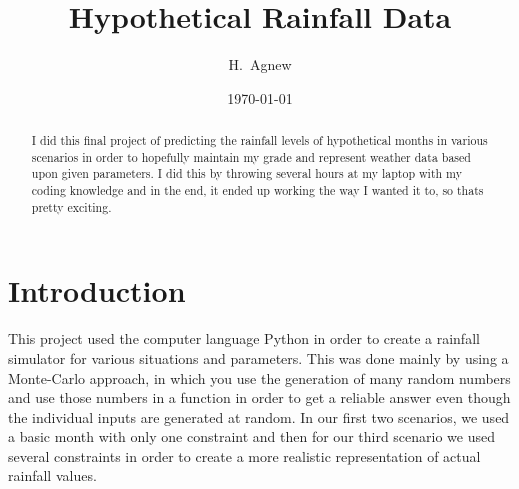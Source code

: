 \documentclass[twocolumn]{revtex4}
\begin{document}
\title{
Hypothetical Rainfall Data
}

\author{H.~Agnew}
\date{\today}

\begin{abstract}
I did this final project of predicting the rainfall levels of hypothetical months in various scenarios in order to hopefully maintain my grade and represent weather data based upon given parameters. I did this by throwing several hours at my laptop with my coding knowledge and in the end, it ended up working the way I wanted it to, so thats pretty exciting.
  
\end{abstract}

\maketitle
\section{Introduction}
This project used the computer language Python in order to create a rainfall simulator for various situations and parameters. This was done mainly by using a Monte-Carlo approach, in which you use the generation of many random numbers and use those numbers in a function in order to get a reliable answer even though the individual inputs are generated at random. In our first two scenarios, we used a basic month with only one constraint and then for our third scenario we used several constraints in order to create a more realistic representation of actual rainfall values.
\end{document}
